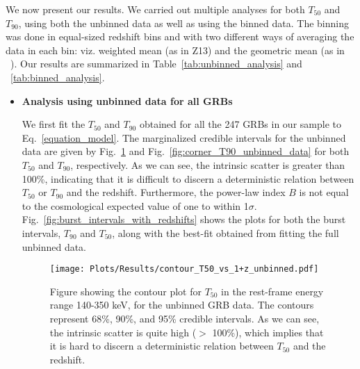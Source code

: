 \documentclass[prd,nofootinbib,preprintnumbers,floatfix]{revtex4}  %
\begin{document}
We now present our results.  We carried out multiple analyses for both $T_{50}$ and $T_{90}$, using both the unbinned data as well as using the binned data. The binning was done in equal-sized redshift bins and with two different ways of averaging the data in each bin: viz. weighted mean (as in Z13) and the geometric mean (as in ~\cite{Butler}). Our results are summarized in Table~\ref{tab:unbinned_analysis} and  ~\ref{tab:binned_analysis}.


\begin{itemize}

\item  {\bf Analysis using unbinned data for all GRBs}

\label{sec:comprehensive_analysis}
We first fit the $T_{50}$ and $T_{90}$ obtained for all the 247 GRBs in our sample to Eq.~\ref{equation_model}. The marginalized credible intervals for the unbinned data are given by Fig.~\ref{fig:corner_T50_unbinned_data} and Fig.~\ref{fig:corner_T90_unbinned_data} for both  $T_{50}$ and $T_{90}$, respectively. As we can see, the intrinsic scatter is greater than 100\%, indicating that it is difficult to discern a deterministic  relation between $T_{50}$ or $T_{90}$ and the redshift. Furthermore, the power-law index $B$ is not equal to the cosmological expected value of one to within 1$\sigma$. Fig.~\ref{fig:burst_intervals_with_redshifts} shows the plots for both the burst intervals, $T_{90}$ and $T_{50}$, along with the best-fit obtained from fitting the full unbinned data.




\begin{figure}
    \centering

    \texttt{[image: Plots/Results/contour\_T50\_vs\_1+z\_unbinned.pdf]}
   
    
    \caption{Figure showing the contour plot for  $T_{50}$ in the rest-frame energy range 140-350 keV, for the unbinned GRB data. The contours represent 68\%, 90\%, and 95\% credible intervals. As we can see, the intrinsic scatter is quite high ($>$ 100\%), which implies that it is hard to discern a deterministic relation between $T_{50}$ and the redshift.} 
    \label{fig:corner_T50_unbinned_data}
\end{figure}



\end{itemize}
\end{document}
